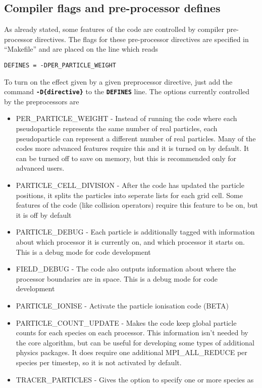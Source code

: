 \documentclass[12pt]{article}
\newcommand{\simpleboxverbatim}{\begin{Verbatim}[obeytabs=true,frame=single,
  framerule=0.5mm,rulecolor=\color{warwickmid}]}
\newcommand{\inlinecode}[1]{{\color{warwickred} \bf\texttt{#1}}}
\begin{document}
\subsection{Compiler flags and pre-processor defines}
As already stated, some features of the code are controlled by compiler
pre-processor directives. The flags for these pre-processor directives are
specified in ``Makefile'' and are placed on the line which reads\\
\simpleboxverbatim
DEFINES = -DPER_PARTICLE_WEIGHT
\end{Verbatim}
To turn on the effect given by a given preprocessor directive, just add the
command \inlinecode{-D\{directive\}} to the \inlinecode{DEFINES} line. The
options currently controlled by the preprocessors are\\
\begin{itemize}
\item PER\_PARTICLE\_WEIGHT - Instead of running the code where each
  pseudoparticle represents the same number of real particles, each
  pseudoparticle can represent a different number of real particles. Many of
  the codes more advanced features require this and it is turned on by
  default. It can be turned off to save on memory, but this is recommended
  only for advanced users.
\item PARTICLE\_CELL\_DIVISION - After the code has updated the particle
  positions, it splits the particles into seperate lists for each grid
  cell. Some features of the code (like collision operators) require this
  feature to be on, but it is off by default
\item PARTICLE\_DEBUG - Each particle is additionally tagged with information
  about which processor it is currently on, and which processor it starts
  on. This is a debug mode for code development
\item FIELD\_DEBUG - The code also outputs information about where the
  processor boundaries are in space. This is a debug mode for code development
\item PARTICLE\_IONISE - Activate the particle ionisation code (BETA)
\item PARTICLE\_COUNT\_UPDATE - Makes the code keep global particle counts for
  each species on each processor. This information isn't needed by the core
  algorithm, but can be useful for developing some types of additional physics
  packages. It does require one additional MPI\_ALL\_REDUCE per species per
  timestep, so it is not activated by default.
\item TRACER\_PARTICLES - Gives the option to specify one or more species as

\end{itemize}
\end{document}
